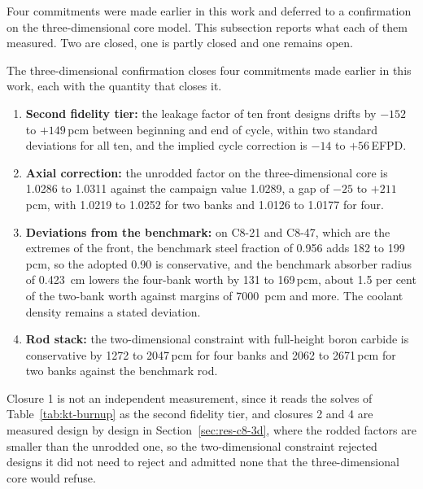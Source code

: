 Four commitments were made earlier in this work and deferred to a
confirmation on the three-dimensional core model. This
subsection reports what each of them measured. Two are closed, one is
partly closed and one remains open.

The three-dimensional confirmation closes four commitments made earlier
in this work, each with the quantity that closes it.

\begin{enumerate}
  \item \textbf{Second fidelity tier:} the leakage factor of ten front
        designs drifts by $-152$ to $+149$\,pcm between beginning and
        end of cycle, within two standard deviations for all ten, and
        the implied cycle correction is $-14$ to $+56$\,EFPD.

  \item \textbf{Axial correction:} the unrodded factor on the
        three-dimensional core is 1.0286 to 1.0311 against the campaign
        value 1.0289, a gap of $-25$ to $+211$\,pcm, with 1.0219 to
        1.0252 for two banks and 1.0126 to 1.0177 for four.

  \item \textbf{Deviations from the benchmark:} on C8-21 and C8-47,
        which are the extremes of the front, the benchmark steel
        fraction of 0.956
        adds 182 to 199\,pcm, so the adopted 0.90 is conservative, and
        the benchmark absorber radius of \SI{0.423}{cm} lowers the
        four-bank worth by 131 to 169\,pcm, about 1.5 per cent of the
        two-bank worth against margins of \SI{7000}{pcm} and more. The
        coolant density remains a stated deviation.

  \item \textbf{Rod stack:} the two-dimensional constraint with full-height
        boron carbide is conservative by 1272 to 2047\,pcm for four
        banks and 2062 to 2671\,pcm for two banks against the benchmark
        rod. 
\end{enumerate}

Closure 1 is not an independent measurement, since it reads the solves
of Table~\ref{tab:kt-burnup} as the second fidelity tier, and closures
2 and 4 are measured design by design in
Section~\ref{sec:res-c8-3d}, where the rodded factors are smaller than
the unrodded one, so the two-dimensional constraint rejected designs it did
not need to reject and admitted none that the three-dimensional core
would refuse.

